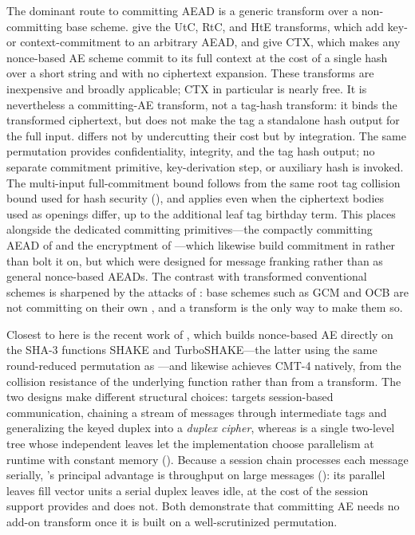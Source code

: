 The dominant route to committing AEAD is a generic transform over a
non-committing base scheme. \cite{BH22} give the \textsf{UtC}, \textsf{RtC}, and
\textsf{HtE} transforms, which add key- or context-commitment to an arbitrary
AEAD, and \cite{CR22} give \textsf{CTX}, which makes any nonce-based AE scheme
commit to its full context at the cost of a single hash over a short string and
with no ciphertext expansion. These transforms are inexpensive and broadly
applicable; \textsf{CTX} in particular is nearly free. It is nevertheless a
committing-AE transform, not a tag-hash transform: it binds the transformed
ciphertext, but does not make the tag a standalone hash output for the full
input. \TW{} differs not by undercutting their cost but by integration. The
same permutation provides confidentiality, integrity, and the tag hash output;
no separate commitment primitive, key-derivation step, or auxiliary hash is
invoked. The multi-input full-commitment bound follows from the same root tag
collision bound used for hash security (), and
 applies even when the ciphertext bodies used as openings
differ, up to the additional leaf tag birthday term. This places \TW{} alongside
the dedicated committing primitives---the compactly committing AEAD of
\cite{GLR17} and the encryptment of \cite{DGRW18}---which likewise build
commitment in rather than bolt it on, but which were designed for message
franking rather than as general nonce-based AEADs. The contrast with transformed
conventional schemes is sharpened by the attacks of : base
schemes such as GCM and OCB are not committing on their own \cite{CR22}, and a
transform is the only way to make them so.

Closest to \TW{} here is the recent work of \cite{DHMVV24}, which builds
nonce-based AE directly on the SHA-3 functions \textsf{SHAKE} and
\textsf{TurboSHAKE}---the latter using the same round-reduced \Keccak{}
permutation as \TW{}---and likewise achieves \textsf{CMT-4} natively, from the
collision resistance of the underlying function rather than from a transform. The
two designs make different structural choices: \cite{DHMVV24} targets
session-based communication, chaining a stream of messages through intermediate
tags and generalizing the keyed duplex into a \emph{duplex cipher}, whereas \TW{}
is a single two-level tree whose independent leaves let the implementation
choose parallelism at runtime with constant memory ().
Because a session
chain processes each message serially, \TW{}'s principal advantage is throughput
on large messages (): its parallel leaves fill vector units
a serial duplex leaves idle, at the cost of the session support \cite{DHMVV24}
provides and \TW{} does not. Both demonstrate
that committing AE needs no add-on transform once it is built on a
well-scrutinized \Keccak{} permutation.

